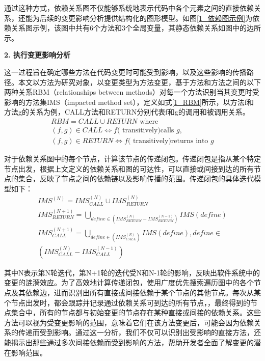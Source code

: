 通过这种方式，依赖关系图不仅能够系统地表示代码中各个元素之间的直接依赖关系，还能为后续的变更影响分析提供结构化的图形模型。如图\ref{1_依赖图示例}为依赖关系图示例，该图中共有6个方法和3个全局变量，其静态依赖关系如图中的边所示。


\noindent \textbf{2. 执行变更影响分析}

这一过程旨在确定哪些方法在代码变更时可能受到影响，以及这些影响的传播路径。本文以方法为研究对象，以变更类型为方法变更\cite{DZBZ202104016}，基于方法和方法之间的以下两种关系RBM（relationships between methods）对每一个方法识别当其变更时受影响的方法集IMS（impacted method set），定义如式\ref{1_RBM}所示，以方法f和方法g的关系为例，CALL方法和RETURN分别代表f和g的调用和被调用关系。
\begin{equation}
\begin{array}{l}
\label{1_RBM}
R B M=C A L L \cup R E T U R N \text { where } \\
(f, g) \in C A L L \Longleftrightarrow f(\text { transitively)calls } g, \\
(f, g) \in R E T U R N \Longleftrightarrow f(\text { transitively)returns into } g
\end{array}
\end{equation}

对于依赖关系图中的每个节点，计算该节点的传递闭包。传递闭包是指从某个特定节点出发，根据上文定义的依赖关系和图的可达性，可以直接或间接到达的所有节点的集合，反映了节点之间的依赖链以及影响传播的范围。传递闭包的具体迭代模型如下：
\begin{equation}
\begin{array}{l}
\label{1_IMS}
I M S^{(N)}=I M S_{C A L L}^{(N)} \cup I M S_{R E T U R N}^{(N)} \\
I M S_{ {RETURN }}^{(N+1)}=\bigcup_{define \in (I M S_{R E T U R N}^{(N)}-I M S_{R E T U R N}^{(N-1)} ) } I M S({ define }) \\
I M S_{C A L L}^{(N+1)}=\bigcup_{ {define } \in (I M S_{C A L L}^{(N)})} I M S( { define }){, define } \in \\
\left(I M S_{C A L L}^{(N)}-I M S_{C A L L}^{(N-1)}\right) 
\end{array}
\end{equation}


其中N表示第N轮迭代，第N+1轮的迭代受N和N-1轮的影响，反映出软件系统中的变更的涟漪效应。为了高效地计算传递闭包，使用广度优先搜索遍历图中的各个节点及其依赖边，进而识别出所有直接或间接依赖于某个节点的其他节点。每次从某个节点出发时，都会跟踪并记录通过依赖关系可到达的所有节点，，最终得到的节点集合中，所有的节点都与初始变更的节点存在某种直接或间接的依赖关系。这些方法可以视为受变更影响的范围，意味着它们在该方法变更后，可能会因为依赖关系的传递而受到影响。通过这一分析，我们不仅可以识别出受影响的直接方法，还能揭示出那些通过多次间接依赖而受到影响的方法，帮助开发者全面了解变更的潜在影响范围。


